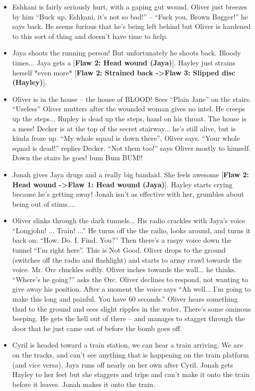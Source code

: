 \begin{itemize}
\item Eshkani is fairly seriously hurt, with a gaping gut wound.  Oliver just breezes by him ``Buck up, Eshkani, it's not so bad!'' -- ``Fuck you, Brown Bagger!'' he says back.  He seems furious that he's being left behind but Oliver is hardened to this sort of thing and doesn't have time to help.
\item Jaya shoots the running person!  But unfortunately he shoots back. Bloody times... Jaya gets a {[}\textbf{Flaw 2: Head wound (Jaya)}{]}.  Hayley just strains herself *even more* {[}\textbf{Flaw 2: Strained back -\textgreater  Flaw 3: Slipped disc (Hayley)}{]}.
\item Oliver is in the house -- the house of BLOOD!  Sees ``Plain Jane'' on the stairs.  ``Useless'' Oliver mutters after the wounded woman gives no intel.   He creeps up the steps...  Rupley is dead up the steps, hand on his throat.  The house is a mess!  Decker is at the top of the secret stairway... he's still alive, but is kinda froze up.  ``My whole squad is down there'', Oliver says.  ``Your whole squad is dead!'' replies Decker.  ``Not them too!'' says Oliver mostly to himself.  Down the stairs he goes! bum Bum BUM!!
\item Jonah gives Jaya drugs and a really big bandaid.  She feels awesome {[}\textbf{Flaw 2: Head wound -\textgreater  Flaw 1: Head wound (Jaya)}{]}.  Hayley starts crying because he's getting away!  Jonah isn't as effective with her, grumbles about being out of stims....
\item Oliver slinks through the dark tunnels...  His radio crackles with Jaya's voice ``Longjohn! ... Train!  ...''  He turns off the the radio, looks around, and turns it back on: ``How. Do. I. Find. You?''  Then there's a raspy voice down the tunnel  ``I'm right here''.  This is Not Good.  Oliver drops to the ground (switches off the radio and flashlight) and starts to army crawl towards the voice.  Mr. Orc chuckles softly. Oliver inches towards the wall... he thinks. ``Where's he going?'' asks the Orc.  Oliver declines to respond, not wanting to give away his position.  After a moment the voice says ``Ah well...  I'm going to make this long and painful.  You have 60 seconds.'' Oliver hears something thud to the ground and sees slight ripples in the water.  There's some ominous beeping.  He gets the hell out of there -- and manages to stagger through the door that he just came out of before the bomb goes off.  
\item Cyril is headed toward a train station, we can hear a train arriving.  We are on the tracks, and can't see anything that is happening on the train platform (and vice versa).  Jaya runs off nearly on her own after Cyril.  Jonah gets Hayley to her feet but she staggers and trips and can't make it onto the train before it leaves.  Jonah makes it onto the train.

\end{itemize}
